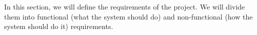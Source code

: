 In this section, we will define the requirements of the project. We will divide them into functional (what the system should do) and non-functional (how the system should do it) requirements.